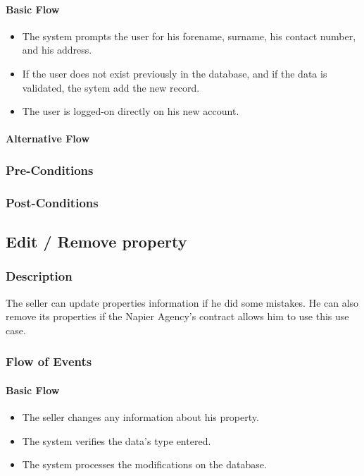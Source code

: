 \documentclass[a4paper,12pt]{article}
\begin{document}
\paragraph{Basic Flow}
\begin{itemize}
\item The system prompts the user for his forename, surname, his contact number, and his address.
\item If the user does not exist previously in the database, and if the data is validated, the sytem add the new record.
\item The user is logged-on directly on his new account.
\end{itemize}
\paragraph{Alternative Flow}
\begin{itemize}
\end{itemize}
\subsubsection{Pre-Conditions}
\subsubsection{Post-Conditions}

\subsection{Edit / Remove property}
\subsubsection{Description}
The seller can update properties information if he did some mistakes. He can also remove its properties if the Napier Agency's contract allows him to use this use case.
\subsubsection{Flow of Events}
\paragraph{Basic Flow}
\begin{itemize}
\item The seller changes any information about his property.
\item The system verifies the data's type entered.
\item The system processes the modifications on the database.
\end{itemize}
\end{document}

